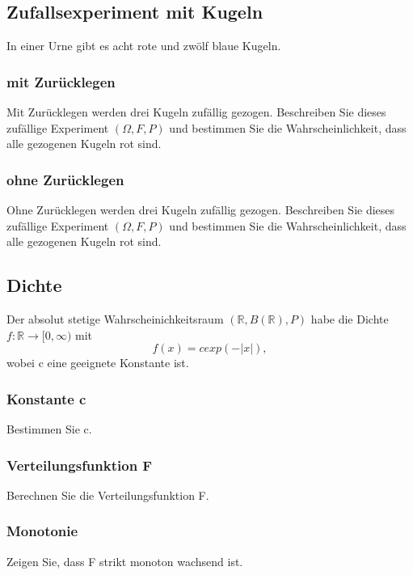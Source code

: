 \documentclass[paper=a4, fontsize=11pt]{scrartcl}
\numberwithin{equation}{section}
\numberwithin{figure}{section}
\numberwithin{table}{section}
\begin{document}
\subsection{Zufallsexperiment mit Kugeln}
In einer Urne gibt es acht rote und zwölf blaue Kugeln.\\

\subsubsection{mit Zurücklegen}
Mit Zurücklegen werden drei Kugeln zufällig gezogen. Beschreiben Sie dieses zufällige Experiment $(\Omega,F,P)$ und bestimmen Sie die Wahrscheinlichkeit, dass alle gezogenen Kugeln rot sind. \\

\subsubsection{ohne Zurücklegen}
Ohne Zurücklegen werden drei Kugeln zufällig gezogen. Beschreiben Sie dieses zufällige Experiment $(\Omega,F,P)$ und bestimmen Sie die Wahrscheinlichkeit, dass alle gezogenen Kugeln rot sind. \\

\subsection{Dichte}
Der absolut stetige Wahrscheinichkeitsraum $(\mathbb{R},B(\mathbb{R}),P)$ habe die Dichte $f:\mathbb{R} \rightarrow [0, \infty)$ mit 
$$f(x)=cexp(-|x|),$$
wobei c eine geeignete Konstante ist. \\

\subsubsection{Konstante c}
Bestimmen Sie c. \\

\subsubsection{Verteilungsfunktion F}
Berechnen Sie die Verteilungsfunktion F. \\

\subsubsection{Monotonie}
Zeigen Sie, dass F strikt monoton wachsend ist. \\
\end{document}
